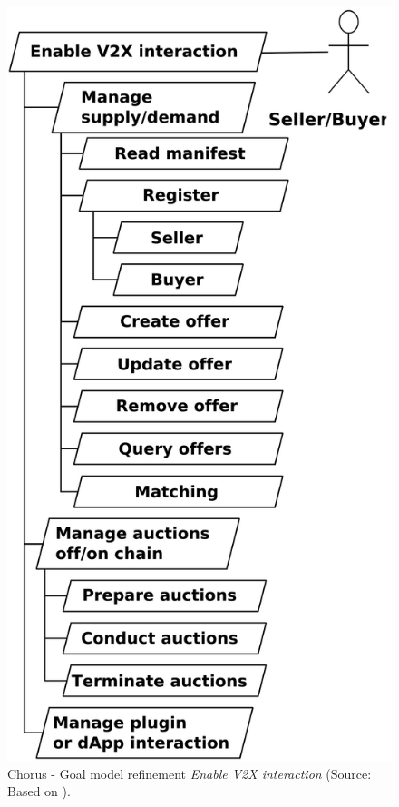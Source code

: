 \documentclass{llncs}
\begin{document}
{				\begin{figure}[H]
					\centering
					\includegraphics[scale=0.175]{Figures/aom/20180501_goal-model--refined-2.pdf}
					\caption{Chorus - Goal model refinement \textit{Enable V2X interaction} (Source: Based on \cite{leidingM2M}).}	
					\label{fig:refined-aom-goal-model-2}
				\end{figure}				
	
}
\end{document}
